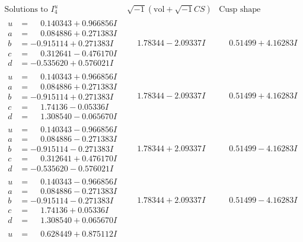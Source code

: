 \documentclass[1p]{elsarticle_modified}
\theoremstyle{definition}
\newcommand{\I}{\sqrt{-1}}
\begin{document}
$$\begin{array}{c|c|c}  
\text{Solutions to }I^u_{4}& \I (\text{vol} + \sqrt{-1}CS) & \text{Cusp shape}\\
 \hline 
\begin{aligned}
u &= \phantom{-}0.140343 + 0.966856 I \\
a &= \phantom{-}0.084886 + 0.271383 I \\
b &= -0.915114 + 0.271383 I \\
c &= \phantom{-}0.312641 - 0.476170 I \\
d &= -0.535620 + 0.576021 I\end{aligned}
 & \phantom{-}1.78344 - 2.09337 I & \phantom{-}0.51499 + 4.16283 I \\ \hline\begin{aligned}
u &= \phantom{-}0.140343 + 0.966856 I \\
a &= \phantom{-}0.084886 + 0.271383 I \\
b &= -0.915114 + 0.271383 I \\
c &= \phantom{-}1.74136 - 0.05336 I \\
d &= \phantom{-}1.308540 - 0.065670 I\end{aligned}
 & \phantom{-}1.78344 - 2.09337 I & \phantom{-}0.51499 + 4.16283 I \\ \hline\begin{aligned}
u &= \phantom{-}0.140343 - 0.966856 I \\
a &= \phantom{-}0.084886 - 0.271383 I \\
b &= -0.915114 - 0.271383 I \\
c &= \phantom{-}0.312641 + 0.476170 I \\
d &= -0.535620 - 0.576021 I\end{aligned}
 & \phantom{-}1.78344 + 2.09337 I & \phantom{-}0.51499 - 4.16283 I \\ \hline\begin{aligned}
u &= \phantom{-}0.140343 - 0.966856 I \\
a &= \phantom{-}0.084886 - 0.271383 I \\
b &= -0.915114 - 0.271383 I \\
c &= \phantom{-}1.74136 + 0.05336 I \\
d &= \phantom{-}1.308540 + 0.065670 I\end{aligned}
 & \phantom{-}1.78344 + 2.09337 I & \phantom{-}0.51499 - 4.16283 I \\ \hline\begin{aligned}
u &= \phantom{-}0.628449 + 0.875112 I \\

\end{aligned}
\end{array}$$
\end{document}
